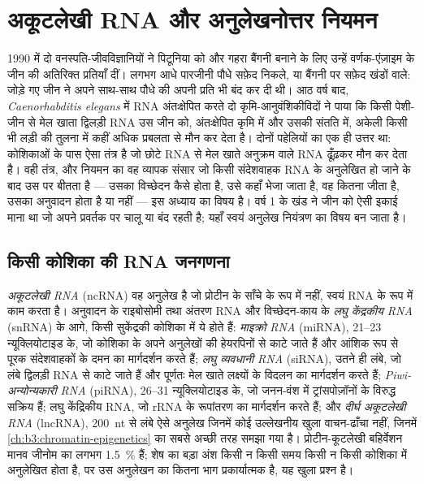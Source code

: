 \chapter{अकूटलेखी RNA और अनुलेखनोत्तर नियमन}\label{ch:b3:rna-regulation}

1990 में दो वनस्पति-जीवविज्ञानियों ने पिटूनिया को और गहरा बैंगनी बनाने
के लिए उन्हें वर्णक-एंज़ाइम के जीन की अतिरिक्त प्रतियाँ दीं। लगभग आधे
पारजीनी पौधे सफ़ेद निकले, या बैंगनी पर सफ़ेद खंडों वाले: जोड़े गए जीन
ने अपने साथ-साथ पौधे की अपनी प्रति भी बंद कर दी थी। आठ वर्ष बाद,
\emph{Caenorhabditis elegans} में RNA अंतःक्षेपित करते दो कृमि-आनुवंशिकीविदों
ने पाया कि किसी पेशी-जीन से मेल खाता द्विलड़ी RNA उस जीन को, अंतःक्षेपित
कृमि में और उसकी संतति में, अकेली किसी भी लड़ी की तुलना में कहीं अधिक
प्रबलता से मौन कर देता है। दोनों पहेलियों का एक ही उत्तर था: कोशिकाओं
के पास ऐसा तंत्र है जो छोटे RNA से मेल खाते अनुक्रम वाले RNA ढूँढ़कर
मौन कर देता है। वही तंत्र, और नियमन का वह व्यापक संसार जो किसी संदेशवाहक
RNA के अनुलेखित हो जाने के बाद उस पर बीतता है --- उसका विच्छेदन कैसे
होता है, उसे कहाँ भेजा जाता है, वह कितना जीता है, उसका अनुवादन होता है
या नहीं --- इस अध्याय का विषय है। वर्ष 1 के खंड ने जीन को ऐसी इकाई
माना था जो अपने प्रवर्तक पर चालू या बंद रहती है; यहाँ स्वयं अनुलेख
नियंत्रण का विषय बन जाता है।

\section{किसी कोशिका की RNA जनगणना}

\begin{definition}[अकूटलेखी RNA]\label{def:b3:rna-regulation:ncrna}
\emph{अकूटलेखी RNA} (ncRNA) वह अनुलेख है जो प्रोटीन के साँचे के रूप
में नहीं, स्वयं RNA के रूप में काम करता है। अनुवादन के राइबोसोमी तथा
अंतरण RNA और विच्छेदन-काय के \emph{लघु केंद्रकीय RNA} (snRNA) के आगे,
किसी सुकेंद्रकी कोशिका में ये होते हैं: \emph{माइक्रो RNA}
(miRNA), \numrange{21}{23} न्यूक्लियोटाइड के, जो कोशिका के अपने
अनुलेखों की हेयरपिनों से काटे जाते हैं और आंशिक रूप से पूरक संदेशवाहकों
के दमन का मार्गदर्शन करते हैं; \emph{लघु व्यवधानी RNA} (siRNA), उतने ही
लंबे, जो लंबे द्विलड़ी RNA से काटे जाते हैं और पूर्णतः मेल खाते
लक्ष्यों के विदलन का मार्गदर्शन करते हैं; \emph{Piwi-अन्योन्यकारी RNA}
(piRNA), \numrange{26}{31} न्यूक्लियोटाइड के, जो जनन-वंश में
ट्रांसपोज़ॉनों के विरुद्ध सक्रिय हैं; लघु केंद्रिकीय RNA, जो rRNA के
रूपांतरण का मार्गदर्शन करते हैं; और \emph{दीर्घ अकूटलेखी RNA} (lncRNA),
\qty{200}{nt} से लंबे ऐसे अनुलेख जिनमें कोई उल्लेखनीय खुला वाचन-ढाँचा
नहीं, जिनमें \cref{ch:b3:chromatin-epigenetics} का \emph{} सबसे
अच्छी तरह समझा गया है। प्रोटीन-कूटलेखी बहिर्वेशन मानव जीनोम का लगभग
\qty{1.5}{\%} हैं; शेष का बड़ा अंश किसी न किसी समय किसी न किसी कोशिका
में अनुलेखित होता है, पर उस अनुलेखन का कितना भाग प्रकार्यात्मक है, यह
खुला प्रश्न है।
\end{definition}

